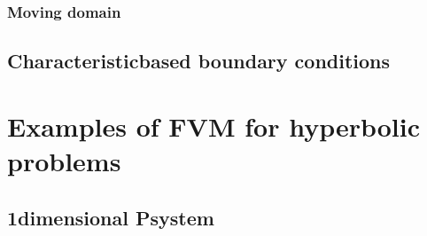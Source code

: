 \documentclass[letterpaper,10pt,english]{jupyterBook}
\begin{document}
\subsubsection{Moving domain}
\label{\detokenize{ch/pde/fvm-hyperbolic-bc:moving-domain}}

\subsection{Characteristic\sphinxhyphen{}based boundary conditions}
\label{\detokenize{ch/pde/fvm-hyperbolic-bc:characteristic-based-boundary-conditions}}\label{\detokenize{ch/pde/fvm-hyperbolic-bc:pde-fvm-hyperbolic-bc-characteristics}}
\sphinxstepscope


\section{Examples of FVM for hyperbolic problems}
\label{\detokenize{ch/pde/fvm-hyperbolic-examples:examples-of-fvm-for-hyperbolic-problems}}\label{\detokenize{ch/pde/fvm-hyperbolic-examples:pde-fvm-hyperbolic-examples}}\label{\detokenize{ch/pde/fvm-hyperbolic-examples::doc}}
\sphinxAtStartPar
{\hyperref[\detokenize{ch/pde/psys-1d:pde-fvm-hyperbolic-examples-psys-1d}]{}}

\sphinxAtStartPar
{\hyperref[\detokenize{ch/pde/euler-1d:pde-fvm-hyperbolic-examples-euler-1d}]{}}

\sphinxAtStartPar
{\hyperref[\detokenize{ch/pde/euler-quasi-1d:pde-fvm-hyperbolic-examples-euler-quasi-1d}]{}}

\sphinxAtStartPar
{\hyperref[\detokenize{ch/pde/euler-1d-ale-piston:pde-fvm-hyperbolic-examples-euler-1d-ale-piston}]{}}

\sphinxstepscope


\subsection{1\sphinxhyphen{}dimensional P\sphinxhyphen{}system}
\label{\detokenize{ch/pde/psys-1d:dimensional-p-system}}\label{\detokenize{ch/pde/psys-1d:pde-fvm-hyperbolic-examples-psys-1d}}\label{\detokenize{ch/pde/psys-1d::doc}}
\end{document}
